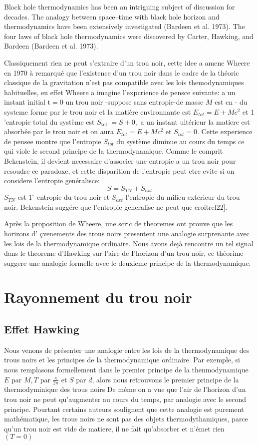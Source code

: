  

Black hole thermodynamics has been an intriguing subject of discussion for decades. The analogy between space–time with black hole horizon and thermodynamics have been extensively investigated (Bardeen et al. 1973). The four laws of black hole thermodynamics were discovered by Carter, Hawking, and Bardeen (Bardeen et al. 1973). 
 

Classiquement rien ne peut s'extraire d'un trou noir, cette idee a amene Wheere en 1970 à remarqué que l'existence d'un trou noir dans le cadre de la théoric classique de la gravitation n'est pas compatible avec les lois themodynamiques habituelles, en effet Wheere a imagine l'expcrience de pensce suivante: a un instant initial $\mathrm{t}=0$ un trou noir -suppose sans entropie-de masse $M$ est $\mathrm{cn}$ -
du systeme forme par le trou noir et la matière environnante est $E_{t o t}=E+M c^{2}$ et 1 'entropie total du système est $S_{\text {tot }}=S+0,$ a un instant ultérieur la matiere est absorbée par le trou noir et on aura $E_{t o t}=E+M c^{2}$ et $S_{t o t}=0 .$ Cette experience de pensee montre que l'entropie $S_{t o t}$ du système diminue au cours du temps ce qui viole le second principe de la thermodynamique. Comme le comprit Bekenstein, il devient necessaire d'associer une entropie a un trou noir pour resoudre ce paradoxe, et cette disparition de l'entropie peut etre evite si on considere l'entropie genéralisce:
$$
S=S_{T N}+S_{e x t}
$$
$S_{T N}$ est $1^{\circ}$ entropie du trou noir et $S_{e x t}$ l'entropie du milieu extericur du trou noir. Bekenstein suggére que l'entropie gencralise ne peut que croitrel22].

Après la proposition de Wheere, une scric de theoremes ont prouve que les horizons d' çvenements des trous noirs presentent une analogie surprenante avec les lois de la thermodynamique ordinaire. Nous avons dejà rencontre un tel signal dans le theoreme d'Hawking sur l'aire de I'horizon d'un trou noir, ce théorime suggere une analogie formelle avec le deuxieme principe de la thermodynamique.



\section { Rayonnement du trou noir}
\subsection {Effet Hawking}
Nous venons de présenter une analogie entre les lois de la thermodynamique des trous noirs et les principes de la thermodynamique ordinaire. Par exemple, si nous remplasons formellement dans le premier principe de la thenmodynamique $E$ par $M, T$ par $\frac{\kappa}{2 \pi}$ et $S$ par $d$, alors nous retrouvons le premier principe de la thermodyminique des trous noirs  De méme on a vue que l'air de l'horizon d'un trou noir ne peut qu'augmenter au cours du temps, par analogie avec le second principe.
 Pourtant certains auteurs soulignent que cette analogie est purement mathématique, les trous noirs ne sont pas des objets thermodythamiques, parce qu'un trou noir est vide de matiere, il ne fait qu'absorber et n'émet rien $(T=0)$

